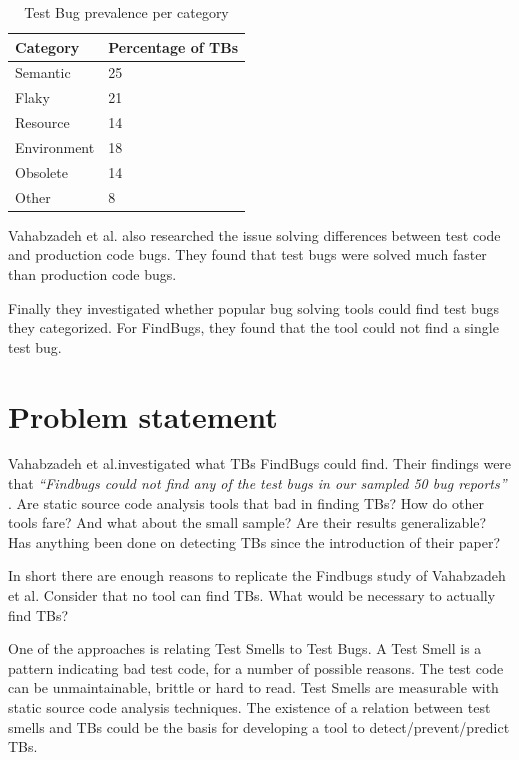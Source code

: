 \documentclass{uvamscse}
\newcommand{\Atestbugs}{Vahabzadeh et al.}
\begin{document}
\begin{table}[]
	\centering
	
	\label{my-label}
	\begin{tabular}{ll}
		\textbf{Category} & \textbf{Percentage of TBs}  \\
		\hline
		Semantic          & 25                         \\
		Flaky             & 21                         \\
		Resource          & 14                         \\
		Environment       & 18                         \\
		Obsolete          & 14                         \\
		Other             & 8                         
	\end{tabular}
	\caption{Test Bug prevalence per category}
\end{table} 

\Atestbugs{} also researched the issue solving differences between test code and production code bugs. They found that test bugs were solved much faster than production code bugs. 

Finally they investigated whether popular bug solving tools could find test bugs they categorized. For FindBugs, they found that the tool could not find a single test bug.

\section{Problem statement}
\Atestbugs investigated what TBs FindBugs could find. Their findings were that \emph{``Findbugs could not find any of the test bugs in our sampled 50 bug reports''} \cite{vahabzadeh2015empirical}. Are static source code analysis tools that bad in finding TBs? How do other tools fare? And what about the small sample? Are their results generalizable? Has anything been done on detecting TBs since the introduction of their paper? 

In short there are enough reasons to replicate the Findbugs study of \Atestbugs{} Consider that no tool can find TBs. What would be necessary to actually find TBs? 

One of the approaches is relating Test Smells to Test Bugs. A Test Smell is a pattern indicating bad test code, for a number of possible reasons. The test code can be unmaintainable, brittle or hard to read. Test Smells are measurable with static source code analysis techniques. The existence of a relation between test smells and TBs could be the basis for developing a tool to detect/prevent/predict TBs.
\end{document}
